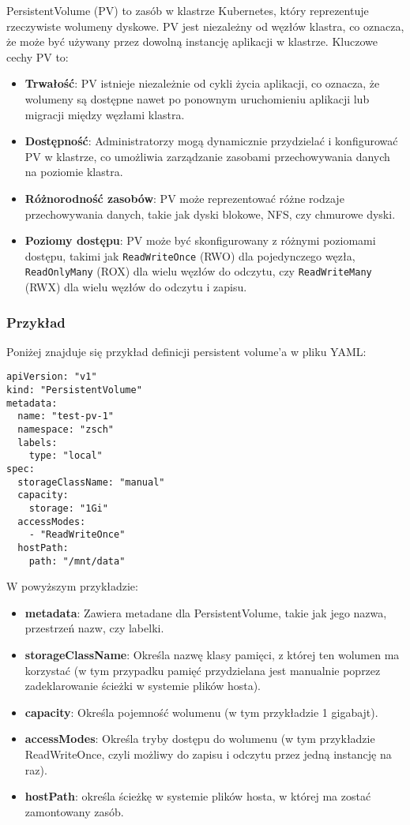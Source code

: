 \documentclass[polish,envcountsect,10pt]{article}
\begin{document}
PersistentVolume (PV) to zasób w klastrze Kubernetes, który reprezentuje rzeczywiste wolumeny dyskowe. PV jest niezależny od węzłów klastra, co oznacza, że może być używany przez dowolną instancję aplikacji w klastrze. Kluczowe cechy PV to:

\begin{itemize}
    \item \textbf{Trwałość}: PV istnieje niezależnie od cykli życia aplikacji, co oznacza, że wolumeny są dostępne nawet po ponownym uruchomieniu aplikacji lub migracji między węzłami klastra.
    \item \textbf{Dostępność}: Administratorzy mogą dynamicznie przydzielać i konfigurować PV w klastrze, co umożliwia zarządzanie zasobami przechowywania danych na poziomie klastra.
    \item \textbf{Różnorodność zasobów}: PV może reprezentować różne rodzaje przechowywania danych, takie jak dyski blokowe, NFS, czy chmurowe dyski.
	\item \textbf{Poziomy dostępu}: PV może być skonfigurowany z różnymi poziomami dostępu, takimi jak \texttt{ReadWriteOnce} (RWO) dla pojedynczego węzła, \texttt{ReadOnlyMany} (ROX) dla wielu węzłów do odczytu, czy \texttt{ReadWriteMany} (RWX) dla wielu węzłów do odczytu i zapisu.
\end{itemize}

\subsubsection{Przykład}

Poniżej znajduje się przykład definicji persistent volume'a w pliku YAML:

\begin{verbatim}
apiVersion: "v1"
kind: "PersistentVolume"
metadata:
  name: "test-pv-1"
  namespace: "zsch"
  labels:
    type: "local"
spec:
  storageClassName: "manual"
  capacity:
    storage: "1Gi"
  accessModes:
    - "ReadWriteOnce"
  hostPath:
    path: "/mnt/data"
\end{verbatim}

\noindent W powyższym przykładzie:
\begin{itemize}
    \item \textbf{metadata}: Zawiera metadane dla PersistentVolume, takie jak jego nazwa, przestrzeń nazw, czy labelki.
    \item \textbf{storageClassName}: Określa nazwę klasy pamięci, z której ten wolumen ma korzystać (w tym przypadku pamięć przydzielana jest manualnie poprzez zadeklarowanie ścieżki w systemie plików hosta).
    \item \textbf{capacity}: Określa pojemność wolumenu (w tym przykładzie 1 gigabajt).
    \item \textbf{accessModes}: Określa tryby dostępu do wolumenu (w tym przykładzie ReadWriteOnce, czyli możliwy do zapisu i odczytu przez jedną instancję na raz).
    \item \textbf{hostPath}: określa ścieżkę w systemie plików hosta, w której ma zostać zamontowany zasób.
\end{itemize}
\end{document}
